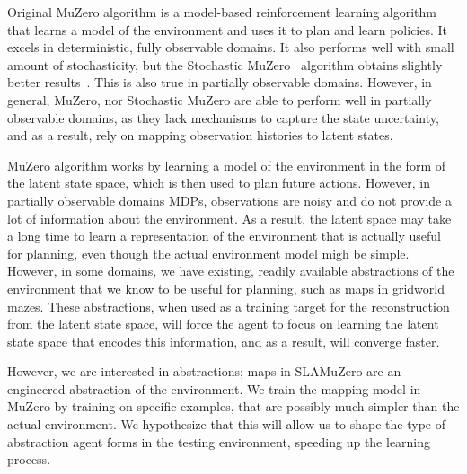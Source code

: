 \documentclass[12pt]{article}
\begin{document}
Original MuZero algorithm is a model-based reinforcement learning algorithm that learns a model of the environment and uses it to plan and learn policies. 
It excels in deterministic, fully observable domains.
It also performs well with small amount of stochasticity, but the Stochastic MuZero~\cite{antonoglouPlanningStochasticEnvironments2021} algorithm obtains slightly better results~\cite{niuLightZeroUnifiedBenchmark2023}. 
This is also true in partially observable domains.
However, in general, MuZero, nor Stochastic MuZero are able to perform well in partially observable domains, as they lack mechanisms to capture the state uncertainty, and as a result, rely on mapping observation histories to latent states.


MuZero algorithm works by learning a model of the environment in the form of the latent state space, which is then used to plan future actions. 
However, in partially observable domains MDPs, observations are noisy and do not provide a lot of information about the environment. 
As a result, the latent space may take a long time to learn a representation of the environment that is actually useful for planning, even though the actual environment model migh be simple.  
However, in some domains, we have existing, readily available abstractions of the environment that we know to be useful for planning, such as maps in gridworld mazes. These abstractions, when used as a training target for the reconstruction from the latent state space, will force the agent to focus on learning the latent state space that encodes this information, and as a result, will converge faster. 


However, we are interested in abstractions; maps in SLAMuZero are an engineered abstraction of the environment. 
We train the mapping model in MuZero by training on specific examples, that are possibly much simpler than the actual environment. 
We hypothesize that this will allow us to shape the type of abstraction agent forms in the testing environment, speeding up the learning process.

\end{document}
